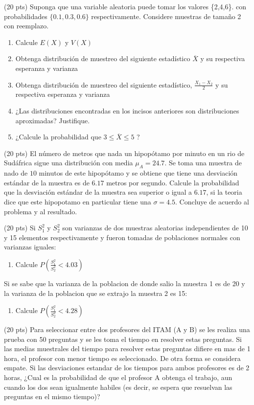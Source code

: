 \documentclass[addpoints]{exam}
\theoremstyle{mytheor}
\begin{document}
  
  \begin{questions} 
  \question (20 pts) Suponga que una variable aleatoria puede tomar los valores \{2,4,6\}. con probabilidades $\{0.1, 0.3, 0.6\}$ respectivamente. Considere muestras de tamaño 2 con reemplazo.
  
  \begin{enumerate}
  \item Calcule $E(X)$ y $V(X)$
  \item Obtenga distribución de muestreo del siguiente estadístico $\overline{X}$ y su respectiva esperanza y varianza
  \item Obtenga distribución de muestreo del siguiente estadístico, $\frac{X_1 - X_2}{2}$ y su respectiva esperanza y varianza
  \item ¿Las distribuciones encontradas en los incisos anteriores son distribuciones aproximadas? Justifique.
  \item ¿Calcule la probabilidad que $3 \leq \overline{X} \leq 5$ ?
  \end{enumerate}
  
  \question (20 pts) 
  El número de metros que nada un hipopótamo por minuto en un rio de Sudáfrica sigue una distribución con media $\mu_A = 24.7$. Se toma una muestra de nado de $10$ minutos de este hipopótamo y se obtiene que tiene una desviación estándar de la muestra es de $6.17$ metros por segundo. Calcule la probabilidad que la desviación estándar de la muestra sea superior o igual a $6.17$, si la teoria dice que este hipopotamo en particular tiene una $\sigma=4.5$. Concluye de acuerdo al problema y al resultado.
 
  \question (20 pts) 
  Si $S_1^2$ y $S_2^2$ son varianzas de dos muestras aleatorias independientes de 10 y 15 elementos respectivamente y fueron tomadas de poblaciones normales con varianzas iguales:
  \begin{enumerate}
  \item Calcule $P(\frac{S_1^2}{S_2^2} < 4.03)$ 
  \end{enumerate}
  
 Si se sabe que la varianza de la poblacion de donde salio la muestra 1 es de 20 y la varianza de la poblacion que se extrajo la muestra 2 es 15:
 \begin{enumerate}
  \item Calcule $P(\frac{S_1^2}{S_2^2} < 4.28)$ 
  \end{enumerate}
  
  
  \question (20 pts) 
Para seleccionar entre dos profesores del ITAM (A y B) se les realiza una prueba con 50 preguntas y se les toma el tiempo en resolver estas preguntas. Si las medias muestrales del tiempo para resolver estas preguntas difiere en mas de 1 hora, el profesor con menor tiempo es seleccionado. De otra forma se considera empate. Si las desviaciones estandar de los tiempos para ambos profesores es de 2 horas, ¿Cual es la probabilidad de que el profesor A obtenga el trabajo, aun cuando los dos sean igualmente habiles (es decir, se espera que resuelvan las preguntas en el mismo tiempo)?
    

\end{questions}
\end{document}
